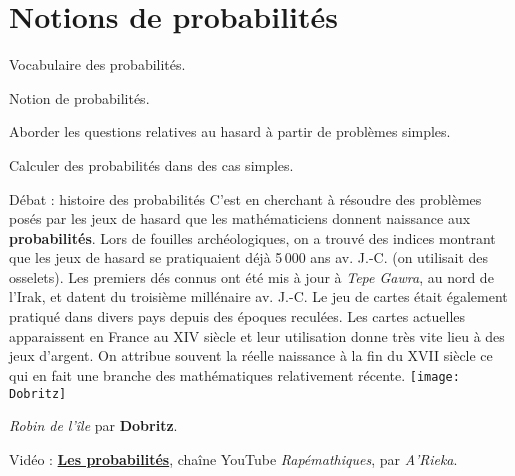 \graphicspath{{../../S12_Notions_de_probabilites/Images/}}

\themeO
\chapter{Notions de probabilités}
\label{S12}

\programme%
   {\item Vocabulaire des probabilités.
    \item Notion de probabilités.}
   {\item Aborder les questions relatives au hasard à partir de problèmes simples.
    \item Calculer des probabilités dans des cas simples.}

\vfill

\begin{debat}{Débat : histoire des probabilités}
   C’est en cherchant à résoudre des problèmes posés par les jeux de hasard que les mathématiciens donnent naissance aux {\bf probabilités}. Lors de fouilles archéologiques, on a trouvé des indices montrant que les jeux de hasard se pratiquaient déjà 5\,000 ans av. J.-C. (on utilisait des osselets). Les premiers dés connus ont été mis à jour à {\it Tepe Gawra}, au nord de l’Irak, et datent du troisième millénaire av. J.-C. Le jeu de cartes était également pratiqué dans divers pays depuis des époques reculées. Les cartes actuelles apparaissent en France au {\small XIV} siècle et leur utilisation donne très vite lieu à des jeux d’argent. On attribue souvent la réelle naissance à la fin du {\small XVII} siècle ce qui en fait une branche des mathématiques relativement récente.
   \tcblower
      \texttt{[image: Dobritz]} \par
      {\it Robin de l'île} par {\bf Dobritz}.
\end{debat}

\hfill {\gray Vidéo : \href{https://www.youtube.com/watch?time_continue=1&v=0xtn22h6LHE&embeds_referring_euri=https%3A%2F%2Fwww.arieka.fr%2F&source_ve_path=Mjg2NjY&feature=emb_logo}{\bf Les probabilités}, chaîne YouTube {\it Rapémathiques}, par {\it A'Rieka}.}


